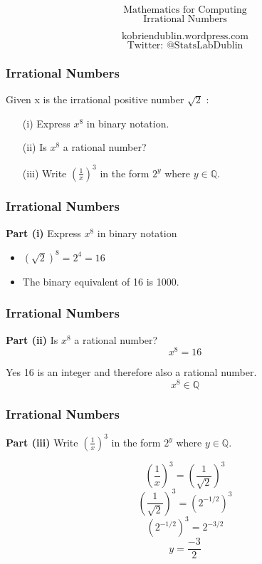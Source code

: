 \documentclass{beamer}
\begin{document}
\begin{frame}
\Huge
\[ \mbox{Mathematics for Computing} \]
\huge
\[ \mbox{Irrational Numbers} \]

\Large
\[ \mbox{kobriendublin.wordpress.com} \]
\[ \mbox{Twitter: @StatsLabDublin} \]

\end{frame}
\begin{frame}
\frametitle{Irrational Numbers}
\Large
\vspace{-1cm}
Given x is the irrational positive number $\sqrt{2}$ :

\begin{itemize}
\item[(i)] Express $x^8$ in binary notation.
\item[(ii)] Is $x^8$ a rational number?
\item[(iii)] Write
$\left( \frac{1}{x} \right)^3$
 in the form $2^y$ where $y \in \mathbb{Q}$.

\end{itemize}
\end{frame} 

\begin{frame}
\frametitle{Irrational Numbers}
\Large
\vspace{-1cm}
\textbf{Part (i)} Express $x^8$ in binary notation\\
\bigskip
\begin{itemize}
\item $(\sqrt{2})^8 = 2^4  = 16$
\item The binary equivalent of 16 is 1000.
\end{itemize}
\end{frame}
\begin{frame}
\frametitle{Irrational Numbers}
\Large
\vspace{-1cm}
\textbf{Part (ii)} Is $x^8$ a rational number?\\

\[x^8 =16 \]

Yes 16 is an integer and therefore also a rational number.
\[x^8 \in \mathbb{Q}\]

\end{frame}



\begin{frame}
\frametitle{Irrational Numbers}
\Large
\vspace{-0.5cm}
\textbf{Part (iii)}  Write
$\left( \frac{1}{x} \right)^3$
 in the form $2^y$ where $y \in \mathbb{Q}$.

\[ \left( \frac{1}{x} \right)^3 = \left( \frac{1}{\sqrt{2}} \right)^3\]
\[\left(  \frac{1}{\sqrt{2}} \right)^3 = \left(2^{-1/2} \right)^3\]
\[ \left(2^{-1/2} \right)^3 = 2^{-3/2}\]
\[y = \frac{-3}{2} \]
\end{frame}
\end{document}
